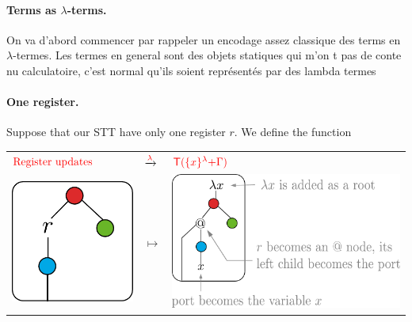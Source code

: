 \paragraph{Terms as $\lambda$-terms.} On va d'abord commencer par rappeler un encodage assez classique des terms en $\lambda$-termes.
Les termes en general sont des objets statiques qui m'on t pas de conte nu calculatoire, c'est normal qu'ils soient représentés par des lambda termes 
\paragraph{One register.} Suppose that our STT have only one register $r$. We define the function
\begin{center}
\begin{tabular}{>{\centering\arraybackslash}m{} >{\centering\arraybackslash}m{} >{\centering\arraybackslash}m{}}
${\color{red}{\text{Register updates}}}$ & $\xrightarrow{{\color{red}{\lambda}}}$ & ${\color{red}{{\color{red}{\mathsf T}}(\{x\}^{\color{red}{\lambda}}{\color{red}{+ \Gamma}})}}$ \\
\includegraphics[scale=.3]{unary-register-update.pdf} & $\mapsto$ & \includegraphics[scale=.3]{its-encoding.pdf}
\end{tabular}
\end{center}
